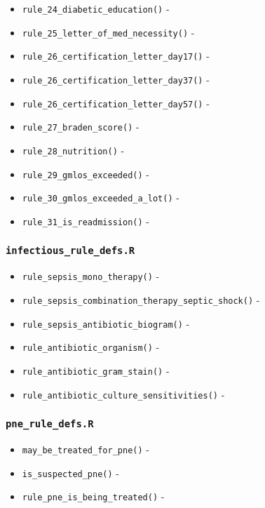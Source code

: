 \documentclass[
]{book}
\providecommand{\tightlist}{%
  \setlength{\itemsep}{0pt}\setlength{\parskip}{0pt}}
\begin{document}
\begin{itemize}
\item
  \texttt{rule\_24\_diabetic\_education()} -
\item
  \texttt{rule\_25\_letter\_of\_med\_necessity()} -
\item
  \texttt{rule\_26\_certification\_letter\_day17()} -
\item
  \texttt{rule\_26\_certification\_letter\_day37()} -
\item
  \texttt{rule\_26\_certification\_letter\_day57()} -
\item
  \texttt{rule\_27\_braden\_score()} -
\item
  \texttt{rule\_28\_nutrition()} -
\item
  \texttt{rule\_29\_gmlos\_exceeded()} -
\item
  \texttt{rule\_30\_gmlos\_exceeded\_a\_lot()} -
\item
  \texttt{rule\_31\_is\_readmission()} -
\end{itemize}

\hypertarget{infectious_rule_defs.r}{%
\subsubsection{\texorpdfstring{\texttt{infectious\_rule\_defs.R}}{infectious\_rule\_defs.R}}\label{infectious_rule_defs.r}}

\begin{itemize}
\tightlist
\item
  \texttt{rule\_sepsis\_mono\_therapy()} -
\item
  \texttt{rule\_sepsis\_combination\_therapy\_septic\_shock()} -
\item
  \texttt{rule\_sepsis\_antibiotic\_biogram()} -
\item
  \texttt{rule\_antibiotic\_organism()} -
\item
  \texttt{rule\_antibiotic\_gram\_stain()} -
\item
  \texttt{rule\_antibiotic\_culture\_sensitivities()} -
\end{itemize}

\hypertarget{pne_rule_defs.r}{%
\subsubsection{\texorpdfstring{\texttt{pne\_rule\_defs.R}}{pne\_rule\_defs.R}}\label{pne_rule_defs.r}}

\begin{itemize}
\tightlist
\item
  \texttt{may\_be\_treated\_for\_pne()} -
\item
  \texttt{is\_suspected\_pne()} -
\item
  \texttt{rule\_pne\_is\_being\_treated()} -
\end{itemize}
\end{document}
